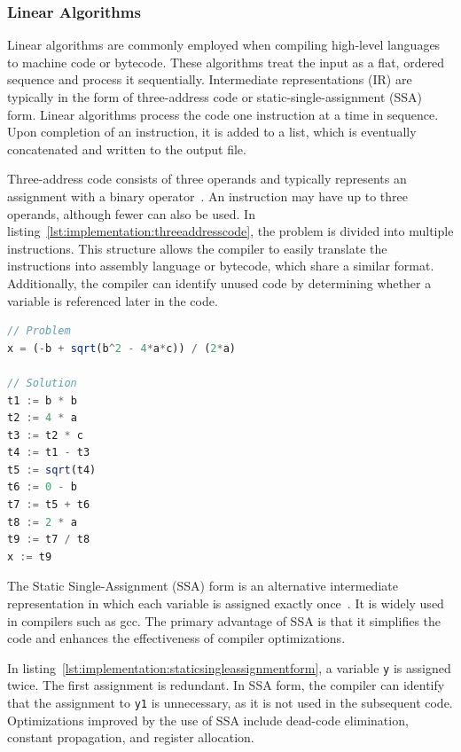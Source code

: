 \subsubsection{Linear Algorithms}

Linear algorithms are commonly employed when compiling high-level languages to machine code or bytecode. These algorithms treat the input as a flat, ordered sequence and process it sequentially. Intermediate representations (IR) are typically in the form of three-address code or static-single-assignment (SSA) form. Linear algorithms process the code one instruction at a time in sequence. Upon completion of an instruction, it is added to a list, which is eventually concatenated and written to the output file.

Three-address code consists of three operands and typically represents an assignment with a binary operator~\cite{wiki:threeaddress}. An instruction may have up to three operands, although fewer can also be used. In listing~\ref{lst:implementation:threeaddresscode}, the problem is divided into multiple instructions. This structure allows the compiler to easily translate the instructions into assembly language or bytecode, which share a similar format. Additionally, the compiler can identify unused code by determining whether a variable is referenced later in the code.

\begin{lstlisting}[language=TypeScript,caption=Three-address code,label=lst:implementation:threeaddresscode]
// Problem
x = (-b + sqrt(b^2 - 4*a*c)) / (2*a)

// Solution
t1 := b * b
t2 := 4 * a
t3 := t2 * c
t4 := t1 - t3
t5 := sqrt(t4)
t6 := 0 - b
t7 := t5 + t6
t8 := 2 * a
t9 := t7 / t8
x := t9
\end{lstlisting}

The Static Single-Assignment (SSA) form is an alternative intermediate representation in which each variable is assigned exactly once~\cite{wiki:singlestatic}. It is widely used in compilers such as \acrshort{gcc}. The primary advantage of SSA is that it simplifies the code and enhances the effectiveness of compiler optimizations.

In listing~\ref{lst:implementation:staticsingleassignmentform}, a variable \lstinline|y| is assigned twice. The first assignment is redundant. In SSA form, the compiler can identify that the assignment to \lstinline|y1| is unnecessary, as it is not used in the subsequent code. Optimizations improved by the use of SSA include dead-code elimination, constant propagation, and register allocation.

